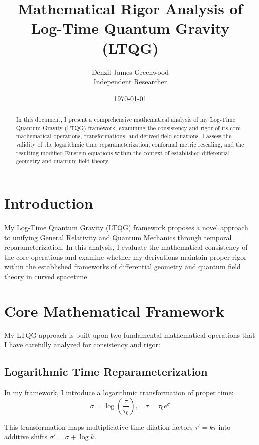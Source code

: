 \documentclass[11pt,a4paper]{article}
\title{Mathematical Rigor Analysis of Log-Time Quantum Gravity (LTQG)}
\author{Denzil James Greenwood\\Independent Researcher}
\date{\today}
\begin{document}
\maketitle

\begin{abstract}
In this document, I present a comprehensive mathematical analysis of my Log-Time Quantum Gravity (LTQG) framework, examining the consistency and rigor of its core mathematical operations, transformations, and derived field equations. I assess the validity of the logarithmic time reparameterization, conformal metric rescaling, and the resulting modified Einstein equations within the context of established differential geometry and quantum field theory.
\end{abstract}

\section{Introduction}

My Log-Time Quantum Gravity (LTQG) framework proposes a novel approach to unifying General Relativity and Quantum Mechanics through temporal reparameterization. In this analysis, I evaluate the mathematical consistency of the core operations and examine whether my derivations maintain proper rigor within the established frameworks of differential geometry and quantum field theory in curved spacetime.

\section{Core Mathematical Framework}

My LTQG approach is built upon two fundamental mathematical operations that I have carefully analyzed for consistency and rigor:

\subsection{Logarithmic Time Reparameterization}

In my framework, I introduce a logarithmic transformation of proper time:
\begin{equation}
\sigma = \log\left(\frac{\tau}{\tau_0}\right), \quad \tau = \tau_0 e^{\sigma}
\end{equation}

This transformation maps multiplicative time dilation factors $\tau' = k\tau$ into additive shifts $\sigma' = \sigma + \log k$.
\end{document}
